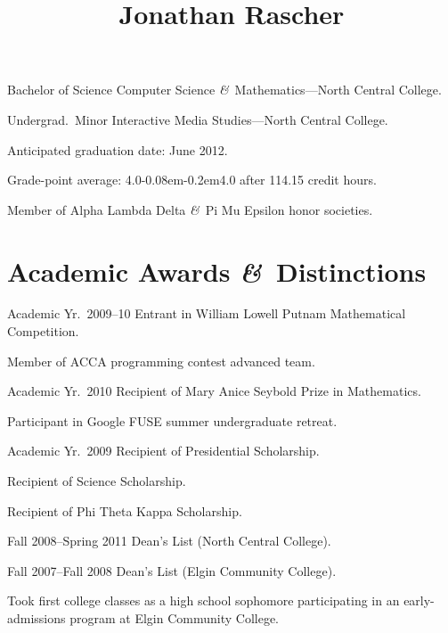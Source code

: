 \documentclass[11pt]{simplecv}
\newcommand*\amp{{\fertigopro\itshape\&}}
\newcommand*\fracslash{\kern-0.08em\raisebox{-0.3ex}{⁄}\kern-0.2em}
\begin{document}


  \title{Jonathan Rascher}
  \maketitle

  \begin{topic}
    \item[Bachelor of Science] Computer Science \amp\ Mathematics---North Central College.

    \item[Undergrad.\ Minor] Interactive Media Studies---North Central College.

    \item Anticipated graduation date: June 2012.

    Grade-point average: 4.0\fracslash 4.0 after 114.15 credit hours.

    Member of Alpha Lambda Delta \amp\ Pi Mu Epsilon honor societies.
  \end{topic}

  \section{Academic Awards \amp\ Distinctions}
  \begin{topic}
    \item[Academic Yr.\ 2009--10] Entrant in William Lowell Putnam Mathematical Competition.

    Member of ACCA programming contest advanced team.

    \item[Academic Yr.\ 2010] Recipient of Mary Anice Seybold Prize in Mathematics.

    Participant in Google FUSE summer undergraduate retreat.

    \item[Academic Yr.\ 2009] Recipient of Presidential Scholarship.

    Recipient of Science Scholarship.

    Recipient of Phi Theta Kappa Scholarship.

    \item[Fall 2008--Spring 2011] Dean's List (North Central College).

    \item[Fall 2007--Fall 2008] Dean's List (Elgin Community College).

    \item Took first college classes as a high school sophomore participating in an early-admissions program at Elgin Community College.
  \end{topic}
\end{document}

